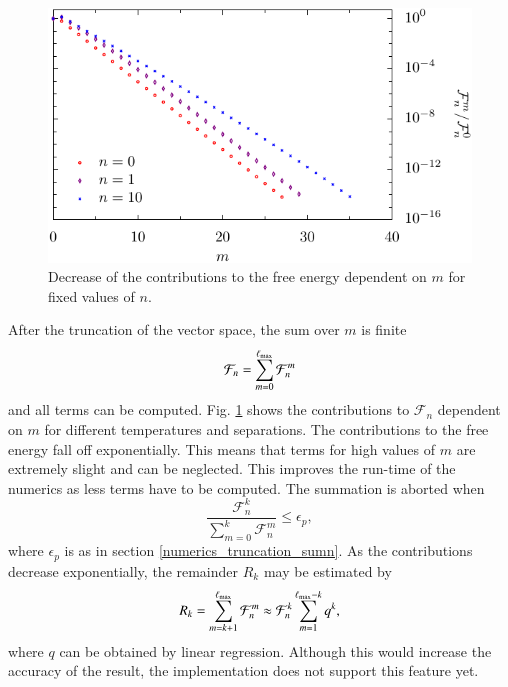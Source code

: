 \begin{figure}
\begin{minipage}[b]{.5\linewidth}
  \end{minipage}
  \begin{minipage}[b]{.5\linewidth}
  \centering
  \includegraphics[scale=0.77]{plots/numeric/summ/RbyL0_2_T10_0.pdf}
  \end{minipage}

  \caption{Decrease of the contributions to the free energy dependent on $m$ for fixed values of $n$.}
  \label{fig:numerics_summ}
\end{figure}

After the truncation of the vector space, the sum over $m$ is finite
\begin{equation}
\mathcal{F}_n = \sum_{m=0}^{\ell_\text{max}} \mathcal{F}^m_n
\end{equation}
and all terms can be computed. Fig. \ref{fig:numerics_summ} shows the contributions
to $\mathcal{F}_n$ dependent on $m$ for different temperatures and separations. The
contributions to the free energy fall off exponentially. This means that terms for
high values of $m$ are extremely slight and can be neglected. This improves the
run-time of the numerics as less terms have to be computed. The summation is
aborted when
\begin{equation}
\frac{\mathcal{F}_n^k}{\sum_{m=0}^k \mathcal{F}^m_n} \le \epsilon_p,
\end{equation}
where $\epsilon_p$ is as in section \ref{numerics_truncation_sumn}. As
the contributions decrease exponentially, the remainder $R_k$ may be estimated
by
\begin{equation}
R_k = \sum_{m=k+1}^{\ell_\text{max}} \mathcal{F}^m_n \approx \mathcal{F}_n^k \sum_{m=1}^{{\ell_\text{max}}-k} q^k,
\end{equation}
where $q$ can be obtained by linear regression. Although this would increase the
accuracy of the result, the implementation does not support this feature yet.


